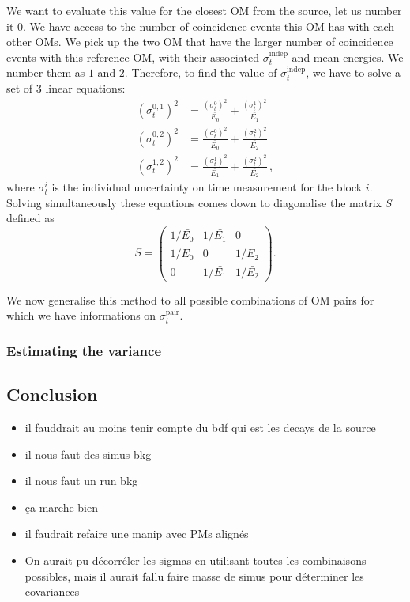 We want to evaluate this value for the closest OM from the source, let us number it $0$.
We have access to the number of coincidence events this OM has with each other OMs.
We pick up the two OM that have the larger number of coincidence events with this reference OM, with their associated $\sigma_{t}^{\text{indep}}$ and mean energies.
We number them as $1$ and $2$.
Therefore, to find the value of $\sigma_{t}^{\text{indep}}$, we have to solve a set of $3$ linear equations:
\begin{align}
  (\sigma_{t}^{0,1})^{2} &= \frac{(\sigma_{t}^{0})^{2}}{\bar{E_{0}}} + \frac{(\sigma_{t}^{1})^{2}}{\bar{E_{1}}}\nonumber \\
  (\sigma_{t}^{0,2})^{2} &= \frac{(\sigma_{t}^{0})^{2}}{\bar{E_{0}}} + \frac{(\sigma_{t}^{2})^{2}}{\bar{E_{2}}}\\
  (\sigma_{t}^{1,2})^{2} &= \frac{(\sigma_{t}^{1})^{2}}{\bar{E_{1}}} + \frac{(\sigma_{t}^{2})^{2}}{\bar{E_{2}}} \nonumber\,,
  \label{eq:Co_sigma}
\end{align}
where $\sigma_{t}^{i}$ is the individual uncertainty on time measurement for the block $i$.
Solving simultaneously these equations comes down to diagonalise the matrix $S$ defined as
\begin{equation}
  S =
  \begin{pmatrix}
    1/\bar{E_{0}} & 1/\bar{E_{1}} & 0 \\
    1/\bar{E_{0}} & 0 & 1/\bar{E_{2}} \\
    0 & 1/\bar{E_{1}} & 1/\bar{E_{2}}
  \end{pmatrix}
  .
\end{equation}

We now generalise this method to all possible combinations of OM pairs for which we have informations on $\sigma_{t}^{\text{pair}}$.

\subsubsection*{Estimating the variance}



\subsection{Conclusion}
\begin{itemize}
\item il fauddrait au moins tenir compte du bdf qui est les decays de la source
\item il nous faut des simus bkg
\item il nous faut un run bkg
\item ça marche bien
\item il faudrait refaire une manip avec PMs alignés
  \item On aurait pu décorréler les sigmas en utilisant toutes les combinaisons possibles, mais il aurait fallu faire masse de simus pour déterminer les covariances
\end{itemize}


